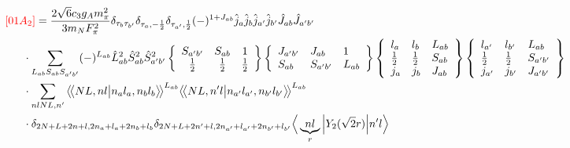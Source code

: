 \documentclass[master]{shnuthesis}
\newcommand{\llangle}{\big\langle\!\big\langle}
\newcommand{\rrangle}{\big\rangle\!\big\rangle}
\newcommand{\ap}{a^\prime}
\newcommand{\bp}{b^\prime}
\newcommand{\il}{\!\!\!\!\!\!\!\!\!\!}
\begin{document}
\begin{align}
    &\il {\color{red} [01A_2]}= \frac{2\sqrt{6}c_3g_A m_\pi^2}{3m_N F_{\pi}^2} \delta_{\tau_b \tau_{\bp}}\delta_{\tau_a, -\frac{1}{2}}\delta_{\tau_{\ap}, \frac{1}{2}} (-)^{1+J_{ab}}\hat{j}_a\hat{j}_b\hat{j}_{\ap}\hat{j}_{\bp}\hat{J}_{ab}\hat{J}_{\ap\bp}  \notag\\
    & \cdot \sum_{L_{ab}S_{ab}S_{\ap\bp}} (-)^{L_{ab}} \hat{L}_{ab}^2\hat{S}_{ab}^2\hat{S}_{\ap\bp}^2  \left\{\begin{array}{ccc} S_{\ap\bp} & S_{ab} & 1 \\ \frac{1}{2} & \frac{1}{2} & \frac{1}{2} \end{array}\right\}  \left\{\begin{array}{lll} J_{\ap\bp} & J_{ab} & 1 \\ S_{ab} & S_{\ap\bp} & L_{ab} \end{array}\right\}  \left\{\begin{array}{lll}l_{a} & l_{b} & L_{ab} \\ \frac{1}{2} & \frac{1}{2} & S_{ab} \\j_{a} & j_{b} & J_{ab} \end{array}\right\} \left\{\begin{array}{lll} l_{\ap} & l_{\bp} & L_{ab} \\ \frac{1}{2} & \frac{1}{2} & S_{\ap\bp} \\j_{\ap} & j_{\bp} & J_{\ap\bp} \end{array}\right\}  \notag \\
    & \cdot \sum_{nlNL,n^\prime} \llangle N L, n l \big| n_{a} l_{a}, n_{b} l_{b} \rrangle^{L_{ab}} \llangle N L, n^\prime l \big| n_{a^\prime} l_{a^\prime}, n_{b^\prime} l_{b^\prime} \rrangle^{L_{ab}} \notag\\
    & \cdot \delta_{2N+L+2n+l,2n_a+l_a+2n_b+l_b}\delta_{2N+L+2n^\prime+l,2n_{a^\prime}+l_{a^\prime}+2n_{b^\prime}+l_{b^\prime}} \Big\langle \underbrace{n l}_{r} \Big| Y_2(\sqrt{2}r) \Big| n^\prime l \Big\rangle
\end{align}
\, \\
\end{document}
